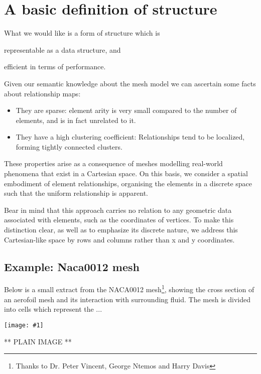 
\section{A basic definition of structure}
What we would like is a form of structure which is
\begin{enumerate*}[label=\alph*)]
\item representable as a data structure, and \item efficient in terms of performance.
\end{enumerate*}

Given our semantic knowledge about the mesh model we can ascertain some facts about relationship maps:
\begin{itemize}
\item They are sparse: element arity is very small compared to the number of elements, and is in fact unrelated to it.
\item They have a high clustering coefficient: Relationships tend to be localized, forming tightly connected clusters.
\end{itemize}

These properties arise as a consequence of meshes modelling real-world phenomena that exist in a Cartesian space.
On this basis, we consider a spatial embodiment of element relationships, organising the elements in a discrete space such that the uniform relationship is apparent.

Bear in mind that this approach carries no relation to any geometric data associated with elements, such as the coordinates of vertices. To make this distinction clear, as well as to emphasize its discrete nature, we address this Cartesian-like space by rows and columns rather than x and y coordinates.

\subsection{Example: Naca0012 mesh}
Below is a small extract from the NACA0012 mesh\footnote{Thanks to Dr. Peter Vincent, George Ntemos and Harry Davis}, showing the cross section of an aerofoil mesh and its interaction with surrounding fluid. The mesh is divided into cells which represent the ...

\newcommand{\drawnaca}[1]{
	\texttt{[image: \#1]}
}
\drawnaca{images/defining-structure/naca0012-plain.pdf}
** PLAIN IMAGE **

